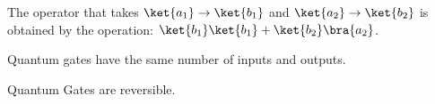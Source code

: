 \begin{lemma}
    The operator that takes $\ket{a_1} \to \ket{b_1}$ and $\ket{a_2} \to \ket{b_2}$ is obtained by the operation:
    $\ket{b_1}\ket{b_1} + \ket{b_2}\bra{a_2}$.
\end{lemma}

\begin{lemma}
    Quantum gates have the same number of inputs and outputs.
\end{lemma}

\begin{lemma}
    Quantum Gates are reversible.
\end{lemma}
